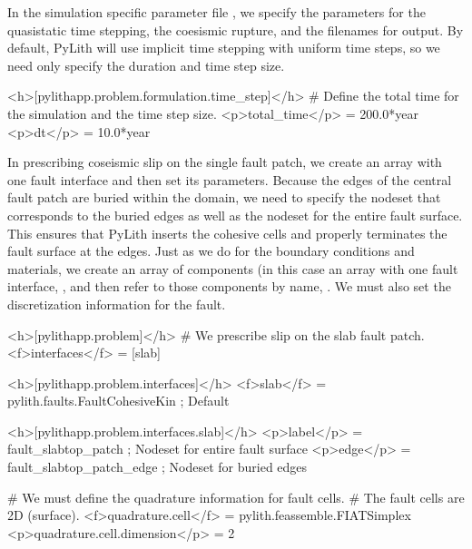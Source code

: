 In the simulation specific parameter file , we
specify the parameters for the quasistatic time stepping, the
coesismic rupture, and the filenames for output. By default, PyLith
will use implicit time stepping with uniform time steps, so we need
only specify the duration and time step size.
\begin{cfg}
<h>[pylithapp.problem.formulation.time_step]</h>
# Define the total time for the simulation and the time step size.
<p>total_time</p> = 200.0*year
<p>dt</p> = 10.0*year
\end{cfg}

In prescribing coseismic slip on the single fault patch, we create an
array with one fault interface and then set its parameters. Because
the edges of the central fault patch are buried within the domain, we
need to specify the nodeset that corresponds to the buried edges as
well as the nodeset for the entire fault surface. This ensures that
PyLith inserts the cohesive cells and properly terminates the fault
surface at the edges. Just as we do for the boundary conditions and
materials, we create an array of components (in this case an array
with one fault interface, , and then refer to those
components by name, . We
must also set the discretization information for the fault.
\begin{cfg}
<h>[pylithapp.problem]</h>
# We prescribe slip on the slab fault patch.
<f>interfaces</f> = [slab]

<h>[pylithapp.problem.interfaces]</h>
<f>slab</f> = pylith.faults.FaultCohesiveKin ; Default

<h>[pylithapp.problem.interfaces.slab]</h>
<p>label</p> = fault_slabtop_patch ; Nodeset for entire fault surface
<p>edge</p> = fault_slabtop_patch_edge ; Nodeset for buried edges

# We must define the quadrature information for fault cells.
# The fault cells are 2D (surface).
<f>quadrature.cell</f> = pylith.feassemble.FIATSimplex
<p>quadrature.cell.dimension</p> = 2
\end{cfg}

